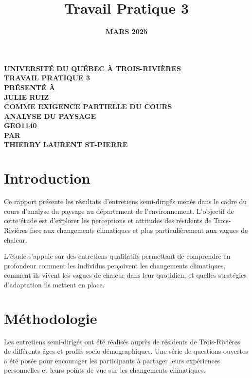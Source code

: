 \documentclass[11pt,a4paper]{article}
\title{\textbf{\Large{Travail Pratique 3}}}
\author{}
\date{\textbf{MARS 2025}}
\begin{document}
\maketitle
\thispagestyle{empty}

\begin{center}
    \fontsize{14pt}{16pt}\selectfont
    \textbf{UNIVERSITÉ DU QUÉBEC À TROIS-RIVIÈRES}\\
    \textbf{TRAVAIL PRATIQUE 3}\\[2cm]
    \textbf{PRÉSENTÉ À}\\
    \textbf{JULIE RUIZ}\\[2cm]
    \textbf{COMME EXIGENCE PARTIELLE DU COURS}\\
    \textbf{ANALYSE DU PAYSAGE}\\
    \textbf{GEO1140}\\[2cm]
    \textbf{PAR}\\
      \textbf{THIERRY LAURENT ST-PIERRE}\\[2cm]

\end{center}

\newpage

\vspace*{\fill}
\tableofcontents
\thispagestyle{empty}
\vspace*{\fill}
\newpage

\section{Introduction}
Ce rapport présente les résultats d'entretiens semi-dirigés menés dans le cadre du cours d'analyse du paysage au département de l'environnement. L'objectif de cette étude est d'explorer les perceptions et attitudes des résidents de Trois-Rivières face aux changements climatiques et plus particulièrement aux vagues de chaleur.

L'étude s'appuie sur des entretiens qualitatifs permettant de comprendre en profondeur comment les individus perçoivent les changements climatiques, comment ils vivent les vagues de chaleur dans leur quotidien, et quelles stratégies d'adaptation ils mettent en place.

\section{Méthodologie}
Les entretiens semi-dirigés ont été réalisés auprès de résidents de Trois-Rivières de différents âges et profils socio-démographiques. Une série de questions ouvertes a été posée pour encourager les participants à partager leurs expériences personnelles et leurs points de vue sur les changements climatiques.
\end{document}
